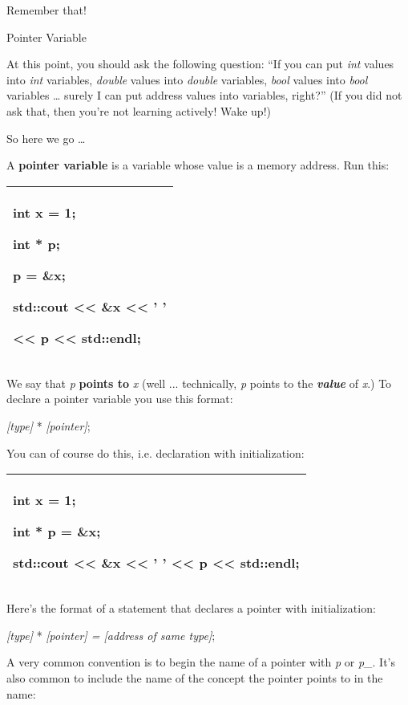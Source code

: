 \documentclass[
]{article}
\begin{document}
Remember that!

Pointer Variable

At this point, you should ask the following question: ``If you can put
\emph{int} values into \emph{int} variables, \emph{double} values into
\emph{double} variables, \emph{bool} values into \emph{bool} variables
\ldots{} surely I can put address values into variables, right?'' (If
you did not ask that, then you're not learning actively! Wake up!)

So here we go \ldots{}

A \textbf{pointer variable} is a variable whose value is a memory
address. Run this:

\begin{longtable}[]{@{}l@{}}
\toprule
\endhead
\begin{minipage}[t]{0.97\columnwidth}\raggedright
int x = 1;

int * p;

p = \&x;

std::cout \textless\textless{} \&x \textless\textless{} ' '

\textless\textless{} p \textless\textless{} std::endl;\strut
\end{minipage}\tabularnewline
\bottomrule
\end{longtable}

We say that \emph{p} \textbf{points to} \emph{x} (well ... technically,
\emph{p} points to the \emph{\textbf{value}} of \emph{x}.) To declare a
pointer variable you use this format:

\emph{{[}type{]}} * \emph{{[}pointer{]}};

You can of course do this, i.e. declaration with initialization:

\begin{longtable}[]{@{}l@{}}
\toprule
\endhead
\begin{minipage}[t]{0.97\columnwidth}\raggedright
int x = 1;

int * p = \&x;

std::cout \textless\textless{} \&x \textless\textless{} ' '
\textless\textless{} p \textless\textless{} std::endl;\strut
\end{minipage}\tabularnewline
\bottomrule
\end{longtable}

Here's the format of a statement that declares a pointer with
initialization:

\emph{{[}type{]}} * \emph{{[}pointer{]} = {[}address of same type{]}};

A very common convention is to begin the name of a pointer with \emph{p}
or \emph{p\_}. It's also common to include the name of the concept the
pointer points to in the name:
\end{document}
